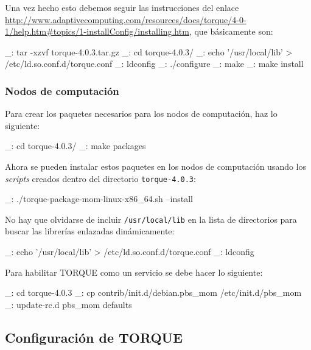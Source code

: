 Una vez hecho esto debemos seguir las instrucciones del enlace \url{http://www.adaptivecomputing.com/resources/docs/torque/4-0-1/help.htm#topics/1-installConfig/installing.htm}, que básicamente son:

\begin{bashcode}
_: tar -xzvf torque-4.0.3.tar.gz
_: cd torque-4.0.3/
_: echo '/usr/local/lib' > /etc/ld.so.conf.d/torque.conf
_: ldconfig
_: ./configure
_: make
_: make install
\end{bashcode}


\subsubsection{Nodos de computación}

Para crear los paquetes necesarios para los nodos de computación, haz lo siguiente:

\begin{bashcode}
_: cd torque-4.0.3/
_: make packages
\end{bashcode}

Ahora se pueden instalar estos paquetes en los nodos de computación usando los \emph{scripts} creados dentro del directorio \texttt{torque-4.0.3}:

\begin{bashcode}
_: ./torque-package-mom-linux-x86_64.sh --install
\end{bashcode}

No hay que olvidarse de incluir \texttt{/usr/local/lib} en la lista de directorios para buscar las librerías enlazadas dinámicamente:

\begin{bashcode}
_: echo '/usr/local/lib' > /etc/ld.so.conf.d/torque.conf
_: ldconfig
\end{bashcode}

Para habilitar TORQUE como un servicio se debe hacer lo siguiente:

\begin{bashcode}
_: cd torque-4.0.3
_: cp contrib/init.d/debian.pbs_mom /etc/init.d/pbs_mom
_: update-rc.d pbs_mom defaults
\end{bashcode}


\subsection{Configuración de TORQUE}


